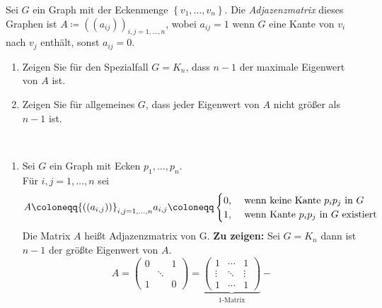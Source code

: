 \begin{assignment}
  Sei \( G \) ein Graph mit der Eckenmenge \( \left \{ v_1, \dots, v_n \right \} \). Die \emph{Adjazenzmatrix} dieses Graphen ist \( A \coloneqq {((a_{ ij }))}_{ i,j = 1, \dots, n } \), wobei \( a_{ ij } = 1 \) wenn \( G \) eine Kante von \( v_i \) nach \( v_j \) enthält, sonst \( a_{ ij } = 0 \).
  \begin{enumerate}[label= (\alph*)] 
    \item Zeigen Sie für den Spezialfall \( G = K_n \), dass \( n-1 \) der maximale Eigenwert von \( A \) ist.
    \item Zeigen Sie für allgemeines \( G \), dass jeder Eigenwert von \( A \) nicht größer als \( n - 1 \) ist.
  \end{enumerate}
\end{assignment}
\begin{solution}
  \
  \begin{enumerate}[label= (\alph*)] 
    \item Sei \( G \) ein Graph mit Ecken \( p_1, \dots , p_n \). \\
    Für \( i,j = 1, \dots , n \) sei 
    \begin{equation*}
      A \coloneqq {((a_{i,j}))}_{i,j = 1,\dots, n} \\
      a_{i,j} \coloneqq 
      \begin{cases}
        0\text{,} &\text{ wenn keine Kante \( p_i p_j \) in \( G \) } \\
        1\text{,} &\text{ wenn Kante \( p_i p_j \) in \( G \) existiert}
      \end{cases}
    \end{equation*}
    Die Matrix \( A \) heißt Adjazenzmatrix von G.
    \textbf{Zu zeigen:} Sei \( G = K_n \) dann ist \( n-1 \) der größte Eigenwert von \( A \). \\
    \begin{equation*}
      A = \begin{pmatrix}
        0 & & 1 \\
        &\ddots & \\
        1 & & 0
      \end{pmatrix} = 
      \underbrace{\begin{pmatrix}
        1 & \cdots & 1 \\
        \vdots & \ddots & \vdots \\
        1 & \cdots & 1
      \end{pmatrix}}_\text{1-Matrix}
      -

\end{equation*}
\end{enumerate}
\end{solution}
